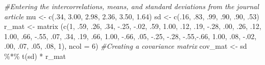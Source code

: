 \documentclass[
]{book}
\newenvironment{Shaded}{\begin{snugshade}}{\end{snugshade}}
\newcommand{\AttributeTok}[1]{\textcolor[rgb]{0.77,0.63,0.00}{#1}}
\newcommand{\CommentTok}[1]{\textcolor[rgb]{0.56,0.35,0.01}{\textit{#1}}}
\newcommand{\DecValTok}[1]{\textcolor[rgb]{0.00,0.00,0.81}{#1}}
\newcommand{\FloatTok}[1]{\textcolor[rgb]{0.00,0.00,0.81}{#1}}
\newcommand{\FunctionTok}[1]{\textcolor[rgb]{0.00,0.00,0.00}{#1}}
\newcommand{\NormalTok}[1]{#1}
\newcommand{\OtherTok}[1]{\textcolor[rgb]{0.56,0.35,0.01}{#1}}
\newcommand{\SpecialCharTok}[1]{\textcolor[rgb]{0.00,0.00,0.00}{#1}}
\begin{document}
\begin{Shaded}
\begin{Highlighting}[]
\CommentTok{\#Entering the intercorrelations, means, and standard deviations from the journal article}
\NormalTok{mu }\OtherTok{\textless{}{-}} \FunctionTok{c}\NormalTok{(.}\DecValTok{34}\NormalTok{, }\FloatTok{3.00}\NormalTok{, }\FloatTok{2.98}\NormalTok{, }\FloatTok{2.36}\NormalTok{, }\FloatTok{3.50}\NormalTok{, }\FloatTok{1.64}\NormalTok{)}
\NormalTok{sd }\OtherTok{\textless{}{-}} \FunctionTok{c}\NormalTok{(.}\DecValTok{16}\NormalTok{, .}\DecValTok{83}\NormalTok{, .}\DecValTok{99}\NormalTok{, .}\DecValTok{90}\NormalTok{, .}\DecValTok{90}\NormalTok{, .}\DecValTok{53}\NormalTok{)}
\NormalTok{r\_mat }\OtherTok{\textless{}{-}} \FunctionTok{matrix}\NormalTok{ (}\FunctionTok{c}\NormalTok{(}\DecValTok{1}\NormalTok{,   .}\DecValTok{59}\NormalTok{, .}\DecValTok{26}\NormalTok{,   .}\DecValTok{34}\NormalTok{,  }\SpecialCharTok{{-}}\NormalTok{.}\DecValTok{25}\NormalTok{, }\SpecialCharTok{{-}}\NormalTok{.}\DecValTok{02}\NormalTok{,}
\NormalTok{                  .}\DecValTok{59}\NormalTok{, }\FloatTok{1.00}\NormalTok{, .}\DecValTok{12}\NormalTok{,   .}\DecValTok{19}\NormalTok{,  }\SpecialCharTok{{-}}\NormalTok{.}\DecValTok{28}\NormalTok{, .}\DecValTok{00}\NormalTok{, }
\NormalTok{                  .}\DecValTok{26}\NormalTok{,  .}\DecValTok{12}\NormalTok{, }\FloatTok{1.00}\NormalTok{, .}\DecValTok{66}\NormalTok{,  }\SpecialCharTok{{-}}\NormalTok{.}\DecValTok{55}\NormalTok{, .}\DecValTok{07}\NormalTok{,}
\NormalTok{                  .}\DecValTok{34}\NormalTok{,  .}\DecValTok{19}\NormalTok{, .}\DecValTok{66}\NormalTok{,  }\FloatTok{1.00}\NormalTok{, }\SpecialCharTok{{-}}\NormalTok{.}\DecValTok{66}\NormalTok{, .}\DecValTok{05}\NormalTok{,}
                 \SpecialCharTok{{-}}\NormalTok{.}\DecValTok{25}\NormalTok{, }\SpecialCharTok{{-}}\NormalTok{.}\DecValTok{28}\NormalTok{, }\SpecialCharTok{{-}}\NormalTok{.}\DecValTok{55}\NormalTok{,}\SpecialCharTok{{-}}\NormalTok{.}\DecValTok{66}\NormalTok{,  }\FloatTok{1.00}\NormalTok{, .}\DecValTok{08}\NormalTok{, }
                 \SpecialCharTok{{-}}\NormalTok{.}\DecValTok{02}\NormalTok{,  .}\DecValTok{00}\NormalTok{,  .}\DecValTok{07}\NormalTok{, .}\DecValTok{05}\NormalTok{, .}\DecValTok{08}\NormalTok{,  }\DecValTok{1}\NormalTok{), }\AttributeTok{ncol =} \DecValTok{6}\NormalTok{)}
\CommentTok{\#Creating a covariance matrix}
\NormalTok{cov\_mat }\OtherTok{\textless{}{-}}\NormalTok{ sd }\SpecialCharTok{\%*\%} \FunctionTok{t}\NormalTok{(sd) }\SpecialCharTok{*}\NormalTok{ r\_mat}


\end{Highlighting}
\end{Shaded}
\end{document}
